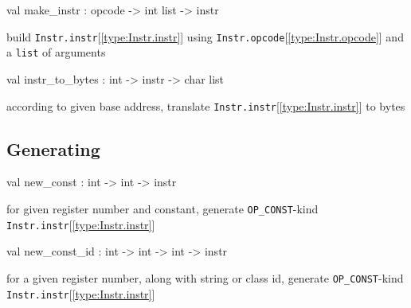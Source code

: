 \documentclass[11pt]{article}
\begin{document}
\label{val:Instr.make-underscoreinstr}\begin{ocamldoccode}
val make_instr : opcode -> int list -> instr
\end{ocamldoccode}
\begin{ocamldocdescription}
build {\tt{Instr.instr}}[\ref{type:Instr.instr}] using {\tt{Instr.opcode}}[\ref{type:Instr.opcode}] and a {\tt{list}} of arguments


\end{ocamldocdescription}




\label{val:Instr.instr-underscoreto-underscorebytes}\begin{ocamldoccode}
val instr_to_bytes : int -> instr -> char list
\end{ocamldoccode}
\begin{ocamldocdescription}
according to given base address, translate {\tt{Instr.instr}}[\ref{type:Instr.instr}] to bytes


\end{ocamldocdescription}




\subsection{Generating}




\label{val:Instr.new-underscoreconst}\begin{ocamldoccode}
val new_const : int -> int -> instr
\end{ocamldoccode}
\begin{ocamldocdescription}
for given register number and constant,
 generate {\tt{OP\_CONST}}-kind {\tt{Instr.instr}}[\ref{type:Instr.instr}]


\end{ocamldocdescription}




\label{val:Instr.new-underscoreconst-underscoreid}\begin{ocamldoccode}
val new_const_id : int -> int -> int -> instr
\end{ocamldoccode}
\begin{ocamldocdescription}
for a given register number, along with string or class id,
 generate {\tt{OP\_CONST}}-kind {\tt{Instr.instr}}[\ref{type:Instr.instr}]


\end{ocamldocdescription}
\end{document}
